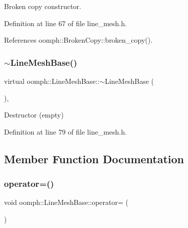 Broken copy constructor. 



Definition at line 67 of file line\+\_\+mesh.\+h.



References oomph\+::\+Broken\+Copy\+::broken\+\_\+copy().

\mbox{\label{classoomph_1_1LineMeshBase_a1716fa6bd365f1a4fa852ee99ab9b46b}} 
\subsubsection{\texorpdfstring{$\sim$\+Line\+Mesh\+Base()}{~LineMeshBase()}}
{\footnotesize\ttfamily virtual oomph\+::\+Line\+Mesh\+Base\+::$\sim$\+Line\+Mesh\+Base (\begin{DoxyParamCaption}{ }\end{DoxyParamCaption})\hspace{0.3cm}{\ttfamily [inline]}, {\ttfamily [virtual]}}



Destructor (empty) 



Definition at line 79 of file line\+\_\+mesh.\+h.



\subsection{Member Function Documentation}
\mbox{\label{classoomph_1_1LineMeshBase_a31bcd5dc1a4c81e95ad21b15865561f1}} 
\subsubsection{\texorpdfstring{operator=()}{operator=()}}
{\footnotesize\ttfamily void oomph\+::\+Line\+Mesh\+Base\+::operator= (\begin{DoxyParamCaption}\item[{const \hyperlink{classoomph_1_1LineMeshBase}{Line\+Mesh\+Base} \&}]{ }\end{DoxyParamCaption})\hspace{0.3cm}{\ttfamily [inline]}}



